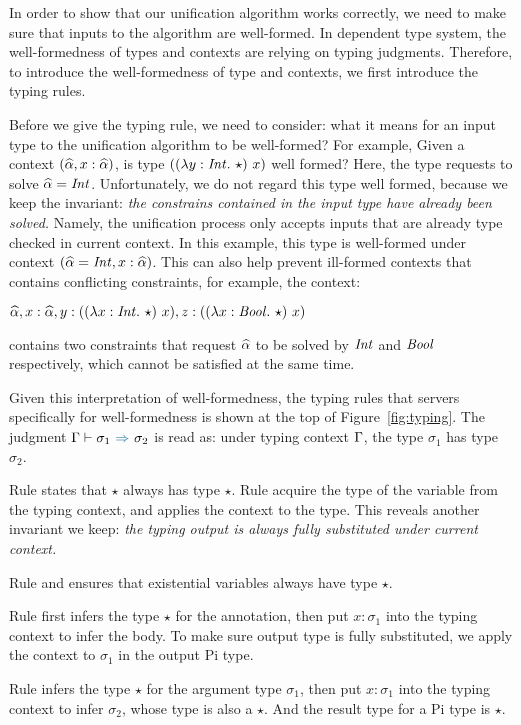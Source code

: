 In order to show that our unification algorithm works correctly, we need to make
sure that inputs to the algorithm are well-formed.
In dependent type system, the well-formedness of types and contexts are relying
on typing judgments.
Therefore, to introduce the well-formedness of type and contexts,
we first introduce the typing rules.

Before we give the typing rule, we need to consider: what it
means for an input type to the unification algorithm to be well-formed?
For example, Given a context $(\widehat{\alpha}, x : \widehat{\alpha})$,
is type $((\lambda y:\mathit{Int}.~ \star) ~ x)$ well formed?
Here, the type requests to solve $\widehat{\alpha} = \mathit{Int}$.
Unfortunately, we do not regard this type well formed, because we keep the
invariant: \textit{the
constrains contained in the input type have already been solved.}
Namely, the unification process only accepts inputs that are already type
checked in current context.
In this example, this type is well-formed under context
$(\widehat{\alpha} = \mathit{Int}, x : \widehat{\alpha})$.
This can also help prevent ill-formed contexts that contains conflicting
constraints, for example, the context:

$\widehat{\alpha}, x: \widehat{\alpha}, y : ((\lambda x:\mathit{Int}.~ \star)~x), z : ((\lambda x:\mathit{Bool}.~ \star)~x)$

\noindent contains two constraints that request $\widehat{\alpha}$ to be solved by $\mathit{Int}$
and $\mathit{Bool}$ respectively, which cannot be satisfied at the same time.

Given this interpretation of well-formedness, the typing rules that servers
specifically for well-formedness is shown at the top of Figure~\ref{fig:typing}.
The judgment $\tctx \byinf \sigma_1 \infto \sigma_2$ is read as: under typing
context $\Gamma$, the type $\sigma_1$ has type $\sigma_2$.

Rule  states that $\star$ always has type $\star$.
Rule  acquire the type of the variable from the typing context, and
applies the context to the type.
This reveals another invariant we keep:
\textit{the typing output is always fully substituted under current context.}

Rule  and  ensures that existential variables
always have type $\star$.

Rule  first infers the type $\star$ for the annotation, then put $x:
\sigma_1$ into the typing context to infer the body. To make sure output type is
fully substituted, we apply the context to $\sigma_1$ in the output Pi type.

Rule  infers the type $\star$ for the argument type $\sigma_1$, then put
$x: \sigma_1$ into the typing context to infer $\sigma_2$, whose type is also a
$\star$. And the result type for a Pi type is $\star$.

